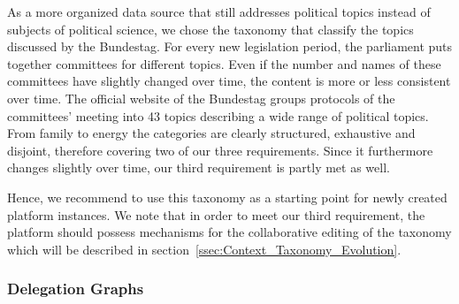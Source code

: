 As a more organized data source that still addresses political topics instead of subjects of political science, we chose the taxonomy that classify the topics discussed by the Bundestag.
For every new legislation period, the parliament puts together committees for different topics.
Even if the number and names of these committees have slightly changed over time, the content is more or less consistent over time.
The official website of the Bundestag groups protocols of the committees' meeting into 43 topics describing a wide range of political topics.
From family to energy the categories are clearly structured, exhaustive and disjoint, therefore covering two of our three requirements. Since it furthermore changes slightly over time, our third requirement is partly met as well.

Hence, we recommend to use this taxonomy as a starting point for newly created  platform instances.
We note that in order to meet our third requirement, the platform should possess mechanisms for the collaborative editing of the taxonomy which will be described in section~\ref{ssec:Context_Taxonomy_Evolution}.

\subsubsection{Delegation Graphs}

